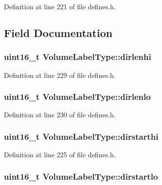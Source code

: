 Definition at line 221 of file defines.\+h.



\subsection{Field Documentation}
\subsubsection[{\texorpdfstring{dirlenhi}{dirlenhi}}]{\setlength{\rightskip}{0pt plus 5cm}uint16\+\_\+t Volume\+Label\+Type\+::dirlenhi}\hypertarget{structVolumeLabelType_a6fa349ef78a7ea0a3006e0c1f4f3a155}{}\label{structVolumeLabelType_a6fa349ef78a7ea0a3006e0c1f4f3a155}


Definition at line 229 of file defines.\+h.

\subsubsection[{\texorpdfstring{dirlenlo}{dirlenlo}}]{\setlength{\rightskip}{0pt plus 5cm}uint16\+\_\+t Volume\+Label\+Type\+::dirlenlo}\hypertarget{structVolumeLabelType_ae1c5205294bf4588b931057d03853d66}{}\label{structVolumeLabelType_ae1c5205294bf4588b931057d03853d66}


Definition at line 230 of file defines.\+h.

\subsubsection[{\texorpdfstring{dirstarthi}{dirstarthi}}]{\setlength{\rightskip}{0pt plus 5cm}uint16\+\_\+t Volume\+Label\+Type\+::dirstarthi}\hypertarget{structVolumeLabelType_aac87a089bec0cf282bf23038937d7635}{}\label{structVolumeLabelType_aac87a089bec0cf282bf23038937d7635}


Definition at line 225 of file defines.\+h.

\subsubsection[{\texorpdfstring{dirstartlo}{dirstartlo}}]{\setlength{\rightskip}{0pt plus 5cm}uint16\+\_\+t Volume\+Label\+Type\+::dirstartlo}\hypertarget{structVolumeLabelType_a193c89f442656a080244f284f1bc008a}{}\label{structVolumeLabelType_a193c89f442656a080244f284f1bc008a}


